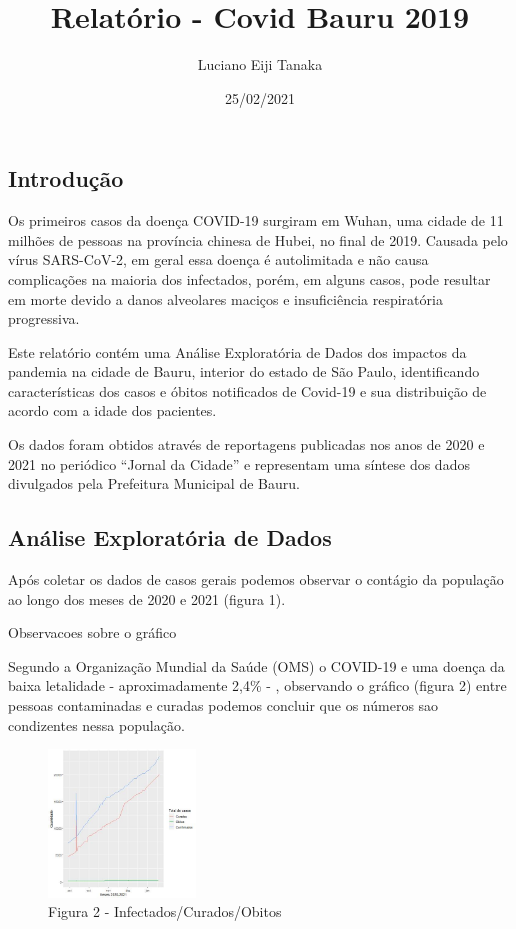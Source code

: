 \documentclass[
]{article}
\title{Relatório - Covid Bauru 2019}
\author{Luciano Eiji Tanaka}
\date{25/02/2021}
\begin{document}
\maketitle

\hypertarget{introduuxe7uxe3o}{%
\subsection{Introdução}\label{introduuxe7uxe3o}}

Os primeiros casos da doença COVID-19 surgiram em Wuhan, uma cidade de
11 milhões de pessoas na província chinesa de Hubei, no final de 2019.
Causada pelo vírus SARS-CoV-2, em geral essa doença é autolimitada e não
causa complicações na maioria dos infectados, porém, em alguns casos,
pode resultar em morte devido a danos alveolares maciços e insuficiência
respiratória progressiva.

Este relatório contém uma Análise Exploratória de Dados dos impactos da
pandemia na cidade de Bauru, interior do estado de São Paulo,
identificando características dos casos e óbitos notificados de Covid-19
e sua distribuição de acordo com a idade dos pacientes.

Os dados foram obtidos através de reportagens publicadas nos anos de
2020 e 2021 no periódico ``Jornal da Cidade'' e representam uma síntese
dos dados divulgados pela Prefeitura Municipal de Bauru.

\hypertarget{anuxe1lise-exploratuxf3ria-de-dados}{%
\subsection{Análise Exploratória de
Dados}\label{anuxe1lise-exploratuxf3ria-de-dados}}

Após coletar os dados de casos gerais podemos observar o contágio da
população ao longo dos meses de 2020 e 2021 (figura 1).

Observacoes sobre o gráfico

Segundo a Organização Mundial da Saúde (OMS) o COVID-19 e uma doença da
baixa letalidade - aproximadamente 2,4\% - , observando o gráfico
(figura 2) entre pessoas contaminadas e curadas podemos concluir que os
números sao condizentes nessa população.

\begin{figure}
\centering
\includegraphics[width=0.35\textwidth,height=\textheight]{./graficos/infectados-curados.jpg}
\caption{Figura 2 - Infectados/Curados/Obitos}
\end{figure}
\end{document}
